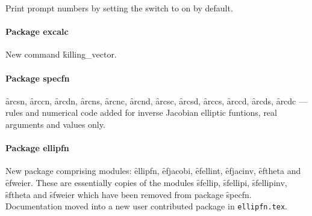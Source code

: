Print prompt numbers by setting the switch  to on by default.

\paragraph{Package excalc}

New command \f{killing\_vector}.

\paragraph{Package specfn}

\f{arcsn}, \f{arccn}, \f{arcdn}, \f{arcns}, \f{arcnc}, \f{arcnd},
\f{arcsc}, \f{arcsd}, \f{arccs}, \f{arccd}, \f{arcds}, \f{arcdc}
--- rules and numerical code added for inverse Jacobian elliptic funtions,
real arguments and values only.

\paragraph{Package ellipfn}

New package comprising modules: \f{ellipfn}, \f{efjacobi}, \f{efellint},
\f{efjacinv}, \f{eftheta} and \f{efweier}.
These are essentially copies of the modules \f{sfellip}, \f{sfellipi},
\f{sfellipinv}, \f{sftheta} and \f{sfweier} which have been removed from
package \f{specfn}.
Documentation moved into a new user contributed package in \texttt{ellipfn.tex}.

